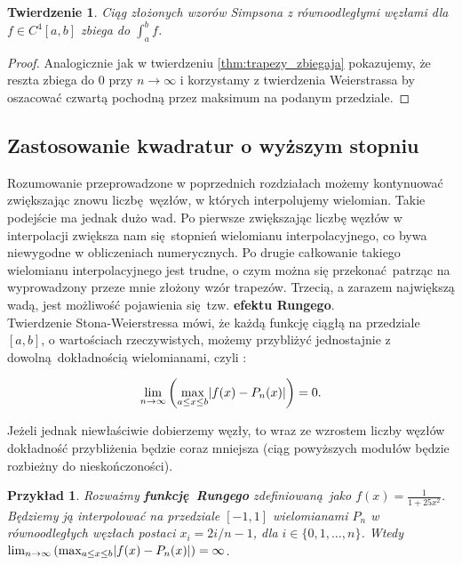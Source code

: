 \documentclass{article}
\DeclarePairedDelimiter\abs{\lvert}{\rvert}
\newtheorem{thm}{Twierdzenie}
\newtheorem{przyklad}{Przykład}
\begin{document}
\begin{thm}
Ciąg złożonych wzorów Simpsona z równoodległymi węzłami dla $f \in C^{4}[a,b]$ zbiega do $\int_{a}^{b} f$.
\end{thm}

\begin{proof}
Analogicznie jak w twierdzeniu \ref{thm:trapezy_zbiegaja} pokazujemy, że reszta zbiega do $0$ przy $n \to \infty$ i korzystamy z twierdzenia Weierstrassa by oszacować czwartą pochodną przez maksimum na podanym przedziale.	
\end{proof}


\subsection{Zastosowanie kwadratur o wyższym stopniu}

Rozumowanie przeprowadzone w poprzednich rozdziałach możemy kontynuować zwiększając znowu liczbę węzłów, w których interpolujemy wielomian. Takie podejście ma jednak dużo wad. Po pierwsze zwiększając liczbę węzłów w interpolacji zwiększa nam się stopnień wielomianu interpolacyjnego, co bywa niewygodne w obliczeniach numerycznych. Po drugie całkowanie takiego wielomianu interpolacyjnego jest trudne, o czym można się przekonać patrząc na wyprowadzony przeze mnie złożony wzór trapezów. Trzecią, a zarazem największą wadą, jest możliwość pojawienia się tzw. \textbf{efektu Rungego}.\\

Twierdzenie Stona-Weierstressa mówi, że każdą funkcję ciągłą na przedziale $[a,b]$, o wartościach rzeczywistych, możemy przybliżyć jednostajnie z dowolną dokładnością wielomianami, czyli :

$$
\lim_{n \to \infty} \left(  \max_{a \leq x \leq b} \abs*{f(x) - P_n(x)} \right) = 0.
$$

Jeżeli jednak niewłaściwie dobierzemy węzły, to wraz ze wzrostem liczby węzłów dokładność przybliżenia będzie coraz mniejsza (ciąg powyższych modułów będzie rozbieżny do nieskończoności).

\begin{przyklad}
Rozważmy \textbf{funkcję Rungego} zdefiniowaną jako $f(x) = \frac{1}{1 + 25x^2}$. Będziemy ją interpolować na przedziale $[-1,1]$ wielomianami $P_n$ w równoodległych węzłach postaci $x_i = 2i/n - 1$, dla $i \in \lbrace 0, 1, \ldots, n \rbrace$. Wtedy $\lim_{n \to \infty} \left(  \max_{a \leq x \leq b} \abs*{f(x) - P_n(x)} \right) = \infty$.
\end{przyklad}
\end{document}
